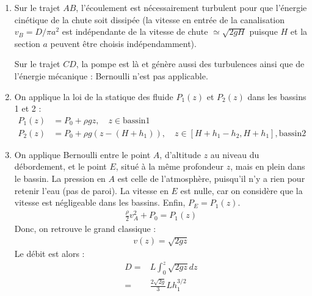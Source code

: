 \begin{correction}

\begin{enumerate}

	\item Sur le trajet $AB$, l'écoulement est nécessairement turbulent pour que l'énergie cinétique de la chute soit dissipée (la vitesse en entrée de la canalisation $v_B=D/\pi a^2$ est indépendante de la vitesse de chute $\simeq\sqrt{2gH}$ puisque $H$ et la section $a$ peuvent être choisis indépendamment). 
	
	Sur le trajet $CD$, la pompe est là et génère aussi des turbulences ainsi que de l'énergie mécanique : Bernoulli n'est pas applicable.

	\item On applique la loi de la statique des fluide $P_1(z)$ et $P_2(z)$ dans les bassins 1 et 2 :
	\begin{align*}
		P_1(z) &= P_0+\rho g z, \quad z\in \mathrm{bassin 1} \\
		P_2(z) &= P_0+\rho g (z - (H + h_1)), \quad z\in [H + h_1 - h_2, H + h_1], \mathrm{bassin 2}
	\end{align*}
	
	\item On applique Bernoulli entre le point $A$, d'altitude $z$ au niveau du débordement, et le point $E$, situé à la même profondeur $z$, mais en plein dans le bassin. La pression en $A$ est celle de l'atmosphère, puisqu'il n'y a rien pour retenir l'eau (pas de paroi). La vitesse en $E$ est nulle, car on considère que la vitesse est négligeable dans les bassins. Enfin, $P_{E}=P_1(z)$.
	\begin{align*}
		\frac{\rho}{2}v_A^2+P_0=P_{1}(z)
	\end{align*}
	Donc, on retrouve le grand classique :
	\begin{align*}
		v(z) = \sqrt{2gz}
	\end{align*}	
	Le débit est alors :
	\begin{align*}
		D =& L\int_0^z\sqrt{2gz}dz \\
		=&\frac{2\sqrt{2g}}{3}Lh_1^{3/2}
	\end{align*}		
	

\end{enumerate}
\end{correction}
